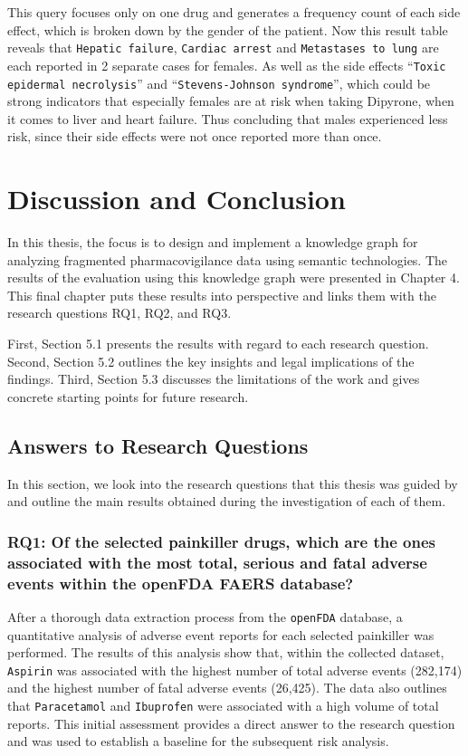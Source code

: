 This query focuses only on one drug and generates a frequency count of each side effect, which is broken down by the gender of the patient. Now this result table reveals that \texttt{Hepatic failure}, \texttt{Cardiac arrest} and \texttt{Metastases to lung} are each reported in 2 separate cases for females. As well as the side effects ``\texttt{Toxic epidermal necrolysis}'' and ``\texttt{Stevens-Johnson syndrome}'', which could be strong indicators that especially females are at risk when taking Dipyrone, when it comes to liver and heart failure. Thus concluding that males experienced less risk, since their side effects were not once reported more than once.


\section{Discussion and Conclusion} 
In this thesis, the focus is to design and implement a knowledge graph for analyzing fragmented pharmacovigilance data using semantic technologies. The results of the evaluation using this knowledge graph were presented in Chapter 4. This final chapter puts these results into perspective and links them with the research questions RQ1, RQ2, and RQ3.

First, Section 5.1 presents the results with regard to each research question. Second, Section 5.2 outlines the key insights and legal implications of the findings. Third, Section 5.3 discusses the limitations of the work and gives concrete starting points for future research.
\subsection{Answers to Research Questions}

In this section, we look into the research questions that this thesis was guided by and outline the main results obtained during the investigation of each of them.

\subsubsection*{RQ1: Of the selected painkiller drugs, which are the ones associated with the most total, serious and fatal adverse events within the openFDA FAERS database?}
After a thorough data extraction process from the \texttt{openFDA} database, a quantitative analysis of adverse event reports for each selected painkiller was performed. The results of this analysis show that, within the collected dataset, \texttt{Aspirin} was associated with the highest number of total adverse events (282,174) and the highest number of fatal adverse events (26,425). The data also outlines that \texttt{Paracetamol} and \texttt{Ibuprofen} were associated with a high volume of total reports. This initial assessment provides a direct answer to the research question and was used to establish a baseline for the subsequent risk analysis.

